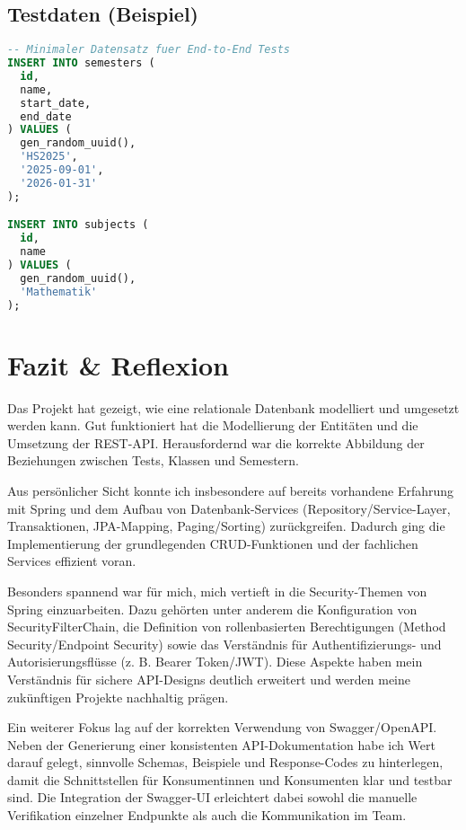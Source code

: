 \documentclass[12pt,a4paper]{article}
\begin{document}
    \subsection{Testdaten (Beispiel)}
    \begin{lstlisting}[language=SQL]
-- Minimaler Datensatz fuer End-to-End Tests
INSERT INTO semesters (
  id,
  name,
  start_date,
  end_date
) VALUES (
  gen_random_uuid(),
  'HS2025',
  '2025-09-01',
  '2026-01-31'
);

INSERT INTO subjects (
  id,
  name
) VALUES (
  gen_random_uuid(),
  'Mathematik'
);
    \end{lstlisting}



    \section{Fazit \& Reflexion}
    Das Projekt hat gezeigt, wie eine relationale Datenbank modelliert und umgesetzt werden kann.
    Gut funktioniert hat die Modellierung der Entitäten und die Umsetzung der REST-API.
    Herausfordernd war die korrekte Abbildung der Beziehungen zwischen Tests, Klassen und Semestern.

    Aus persönlicher Sicht konnte ich insbesondere auf bereits vorhandene Erfahrung mit Spring und
    dem Aufbau von Datenbank-Services (Repository/Service-Layer, Transaktionen, JPA-Mapping,
    Paging/Sorting) zurückgreifen. Dadurch ging die Implementierung der grundlegenden CRUD-Funktionen
    und der fachlichen Services effizient voran.

    Besonders spannend war für mich, mich vertieft in die Security-Themen von Spring einzuarbeiten.
    Dazu gehörten unter anderem die Konfiguration von SecurityFilterChain, die Definition von
    rollenbasierten Berechtigungen (Method Security/Endpoint Security) sowie das Verständnis für
    Authentifizierungs- und Autorisierungsflüsse (z. B. Bearer Token/JWT). Diese Aspekte haben mein
    Verständnis für sichere API-Designs deutlich erweitert und werden meine zukünftigen Projekte
    nachhaltig prägen.

    Ein weiterer Fokus lag auf der korrekten Verwendung von Swagger/OpenAPI. Neben der Generierung
    einer konsistenten API-Dokumentation habe ich Wert darauf gelegt, sinnvolle Schemas, Beispiele
    und Response-Codes zu hinterlegen, damit die Schnittstellen für Konsumentinnen und Konsumenten
    klar und testbar sind. Die Integration der Swagger-UI erleichtert dabei sowohl die manuelle
    Verifikation einzelner Endpunkte als auch die Kommunikation im Team.
\end{document}
